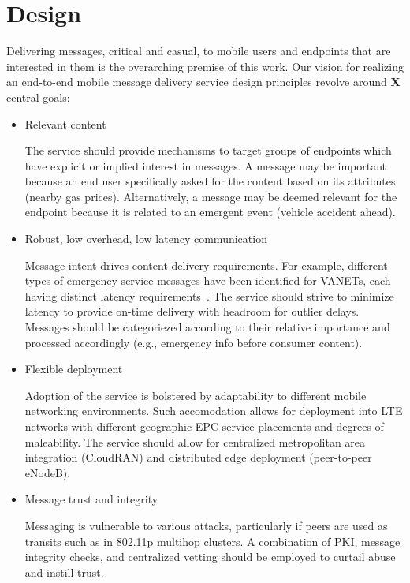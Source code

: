 \section{Design}

Delivering messages, critical and casual, to mobile users and
endpoints that are interested in them is the overarching premise of
this work. Our vision for realizing an end-to-end mobile message
delivery service design principles revolve around {\bf X} central
goals:

\begin{itemize}
\item Relevant content

The service should provide mechanisms to target groups of endpoints
which have explicit or implied interest in messages. A message may be
important because an end user specifically asked for the content based
on its attributes (nearby gas prices). Alternatively, a message may be
deemed relevant for the endpoint because it is related to an emergent
event (vehicle accident ahead).

\item Robust, low overhead, low latency communication

Message intent drives content delivery requirements.  For example,
different types of emergency service messages have been identified for
VANETs, each having distinct latency
requirements~\cite{vanet-msg-reqs}. The service should strive to
minimize latency to provide on-time delivery with headroom for outlier
delays. Messages should be categoriezed according to their relative
importance and processed accordingly (e.g., emergency info before
consumer content).

\item Flexible deployment

Adoption of the service is bolstered by adaptability to different
mobile networking environments.  Such accomodation allows for
deployment into LTE networks with different geographic EPC service
placements and degrees of maleability.  The service should allow for
centralized metropolitan area integration (CloudRAN) and distributed
edge deployment (peer-to-peer eNodeB).

\item Message trust and integrity

Messaging is vulnerable to various attacks, particularly if peers are
used as transits such as in 802.11p multihop clusters. A combination
of PKI, message integrity checks, and centralized vetting should be
employed to curtail abuse and instill trust.


\end{itemize}
